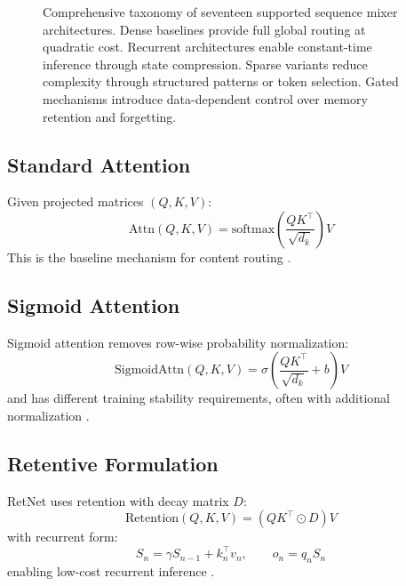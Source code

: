 \documentclass[11pt,a4paper]{article}
\begin{document}
\begin{figure}[t]
{}
\caption{Comprehensive taxonomy of seventeen supported sequence mixer architectures. Dense baselines provide full global routing at quadratic cost. Recurrent architectures enable constant-time inference through state compression. Sparse variants reduce complexity through structured patterns or token selection. Gated mechanisms introduce data-dependent control over memory retention and forgetting.}
\label{fig:comprehensive-taxonomy}
\end{figure}

\subsection{Standard Attention}
Given projected matrices $(Q,K,V)$:
\[
\text{Attn}(Q,K,V)=\text{softmax}\left(\frac{QK^\top}{\sqrt{d_k}}\right)V
\]
This is the baseline mechanism for content routing \citep{vaswani_attention_2017}.

\subsection{Sigmoid Attention}
Sigmoid attention removes row-wise probability normalization:
\[
\text{SigmoidAttn}(Q,K,V)=\sigma\left(\frac{QK^\top}{\sqrt{d_k}}+b\right)V
\]
and has different training stability requirements, often with additional normalization \citep{ramapuram_theory_2024}.

\subsection{Retentive Formulation}
RetNet uses retention with decay matrix $D$:
\[
\text{Retention}(Q,K,V)=\left(QK^\top \odot D\right)V
\]
with recurrent form:
\[
S_n=\gamma S_{n-1}+k_n^\top v_n,\qquad o_n=q_n S_n
\]
enabling low-cost recurrent inference \citep{sun_retentive_2023,yang_survey_2025}.
\end{document}
